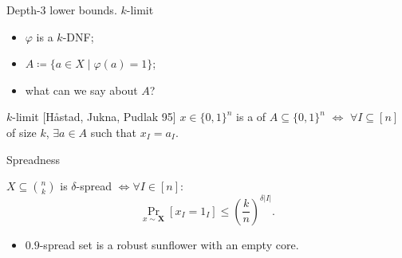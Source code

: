 \begin{frame}{Depth-$3$ lower bounds. $k$-limit}


    \begin{itemize}
        \item $\varphi$ is a $k$-DNF;
        \item $A \coloneqq \{a \in X \mid \varphi(a) = 1\}$;
        \item what can we say about $A$?
    \end{itemize}

    \pause

    \begin{block}{$k$-limit [H{\aa}stad, Jukna, Pudlak 95]}
        $x \in \{0, 1\}^n$ is a  of $A \subseteq \{0, 1\}^n$ $\Leftrightarrow$
        $\forall I \subseteq [n]$ of size $k$, $\exists a \in A$ such that $x_I = a_I$.
    \end{block}

    \pause
    \begin{center}
        
    \end{center}
\end{frame}



\begin{frame}{Spreadness}

    $X \subseteq \binom{n}{k}$ is $\delta$-spread $\Leftrightarrow
    \forall I \in [n]$:
    $$
        \Pr\limits_{x \sim \mathbf{X}}[x_I = 1_I] \le \left(\frac{k}{n}\right)^{\delta |I|}.
    $$

    \pause

    \begin{center}
        
    \end{center}

    \pause
    \pause
    \pause

    \begin{itemize}
        \item $0.9$-spread set is a robust sunflower with an empty core.
    \end{itemize}
    
\end{frame}



